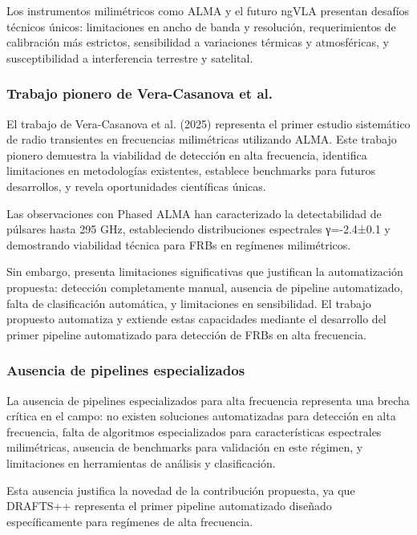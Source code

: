 Los instrumentos milimétricos como ALMA y el futuro ngVLA presentan desafíos técnicos únicos: limitaciones en ancho de banda y resolución, requerimientos de calibración más estrictos, sensibilidad a variaciones térmicas y atmosféricas, y susceptibilidad a interferencia terrestre y satelital.

\subsubsection{Trabajo pionero de Vera-Casanova et al.}

El trabajo de Vera-Casanova et al. (2025) \cite{veracasanova2025} representa el primer estudio sistemático de radio transientes en frecuencias milimétricas utilizando ALMA. Este trabajo pionero demuestra la viabilidad de detección en alta frecuencia, identifica limitaciones en metodologías existentes, establece benchmarks para futuros desarrollos, y revela oportunidades científicas únicas.

Las observaciones con Phased ALMA \cite{veracasanova2025} han caracterizado la detectabilidad de púlsares hasta 295 GHz, estableciendo distribuciones espectrales γ=-2.4±0.1 y demostrando viabilidad técnica para FRBs en regímenes milimétricos.

Sin embargo, presenta limitaciones significativas que justifican la automatización propuesta: detección completamente manual, ausencia de pipeline automatizado, falta de clasificación automática, y limitaciones en sensibilidad. El trabajo propuesto automatiza y extiende estas capacidades mediante el desarrollo del primer pipeline automatizado para detección de FRBs en alta frecuencia.

\subsubsection{Ausencia de pipelines especializados}

La ausencia de pipelines especializados para alta frecuencia representa una brecha crítica en el campo: no existen soluciones automatizadas para detección en alta frecuencia, falta de algoritmos especializados para características espectrales milimétricas, ausencia de benchmarks para validación en este régimen, y limitaciones en herramientas de análisis y clasificación.

Esta ausencia justifica la novedad de la contribución propuesta, ya que DRAFTS++ representa el primer pipeline automatizado diseñado específicamente para regímenes de alta frecuencia.

